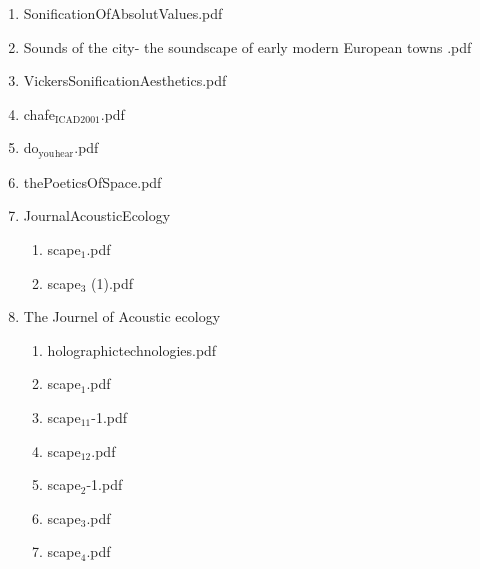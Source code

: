 \documentclass[11pt]{article}
\begin{document}
\begin{enumerate}
\begin{enumerate}
\begin{enumerate}
\begin{enumerate}
\begin{enumerate}
\item SonificationOfAbsolutValues.pdf
\label{sec-1-1-1-1-7-3-44-13}

\item Sounds of the city- the  soundscape of early modern  European towns  .pdf
\label{sec-1-1-1-1-7-3-44-14}

\item VickersSonificationAesthetics.pdf
\label{sec-1-1-1-1-7-3-44-15}

\item chafe$_{\text{ICAD2001}}$.pdf
\label{sec-1-1-1-1-7-3-44-16}

\item do$_{\text{you}}$$_{\text{hear}}$.pdf
\label{sec-1-1-1-1-7-3-44-17}

\item thePoeticsOfSpace.pdf
\label{sec-1-1-1-1-7-3-44-18}

\item JournalAcousticEcology
\label{sec-1-1-1-1-7-3-44-19}
\begin{enumerate}
\item scape$_{\text{1}}$.pdf
\label{sec-1-1-1-1-7-3-44-19-1}

\item scape$_{\text{3}}$ (1).pdf
\label{sec-1-1-1-1-7-3-44-19-2}
\end{enumerate}

\item The Journel of Acoustic ecology
\label{sec-1-1-1-1-7-3-44-20}
\begin{enumerate}
\item holographictechnologies.pdf
\label{sec-1-1-1-1-7-3-44-20-1}

\item scape$_{\text{1}}$.pdf
\label{sec-1-1-1-1-7-3-44-20-2}

\item scape$_{\text{11}}$-1.pdf
\label{sec-1-1-1-1-7-3-44-20-3}

\item scape$_{\text{12}}$.pdf
\label{sec-1-1-1-1-7-3-44-20-4}

\item scape$_{\text{2}}$-1.pdf
\label{sec-1-1-1-1-7-3-44-20-5}

\item scape$_{\text{3}}$.pdf
\label{sec-1-1-1-1-7-3-44-20-6}

\item scape$_{\text{4}}$.pdf
\label{sec-1-1-1-1-7-3-44-20-7}


\end{enumerate}
\end{enumerate}
\end{enumerate}
\end{enumerate}
\end{enumerate}
\end{enumerate}
\end{document}
